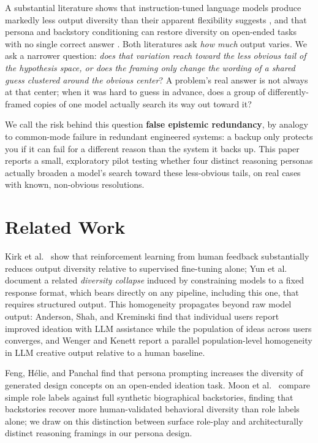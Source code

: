 \documentclass[11pt]{article}
\begin{document}
A substantial literature shows that instruction-tuned language models
produce markedly less output diversity than their apparent flexibility
suggests \citep{kirk2023,yun2025}, and that persona and backstory
conditioning can restore diversity on open-ended tasks with no single
correct answer \citep{feng2025,moon2024}. Both literatures ask \emph{how
much} output varies. We ask a narrower question: \emph{does that variation
reach toward the less obvious tail of the hypothesis space, or does the
framing only change the wording of a shared guess clustered around the
obvious center}? A problem's real answer is not always at that center; when
it was hard to guess in advance, does a group of differently-framed copies
of one model actually search its way out toward it?

We call the risk behind this question \textbf{false epistemic redundancy},
by analogy to common-mode failure in redundant engineered systems: a backup
only protects you if it can fail for a different reason than the system it
backs up. This paper reports a small, exploratory pilot testing whether
four distinct reasoning personas actually broaden a model's search toward
these less-obvious tails, on real cases with known, non-obvious
resolutions.

\section{Related Work}
\label{sec:related}

Kirk et al.\ \citep{kirk2023} show that reinforcement learning from human
feedback substantially reduces output diversity relative to supervised
fine-tuning alone; Yun et al.\ \citep{yun2025} document a related
\emph{diversity collapse} induced by constraining models to a fixed
response format, which bears directly on any pipeline, including this one,
that requires structured output. This homogeneity propagates beyond raw
model output: Anderson, Shah, and Kreminski \citep{anderson2024} find that
individual users report improved ideation with LLM assistance while the
population of ideas across users converges, and Wenger and Kenett
\citep{wenger2026} report a parallel population-level homogeneity in LLM
creative output relative to a human baseline.

Feng, H\'elie, and Panchal \citep{feng2025} find that persona prompting
increases the diversity of generated design concepts on an open-ended
ideation task. Moon et al.\ \citep{moon2024} compare simple role labels
against full synthetic biographical backstories, finding that backstories
recover more human-validated behavioral diversity than role labels alone;
we draw on this distinction between surface role-play and architecturally
distinct reasoning framings in our persona design.
\end{document}

